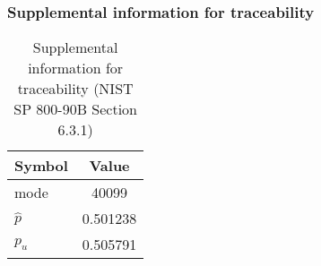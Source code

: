 \documentclass[a3paper,xelatex,english]{bxjsarticle}
\begin{document}
\subsubsection{Supplemental information for traceability}
\renewcommand{\arraystretch}{1.8}
\begin{table}[h]
\caption{Supplemental information for traceability (NIST SP 800-90B Section 6.3.1)}
\begin{center}
\begin{tabular}{|l|c|}
\hline 
\rowcolor{anotherlightblue} %
Symbol				& Value \\ \hline 
mode				&    40099\\ \hline 
$\hat{p}$ 			& 0.501238\\ \hline
$p_u$				& 0.505791\\ \hline
\end{tabular}
\end{center}
\end{table}
\renewcommand{\arraystretch}{1.4}
\clearpage
\end{document}
